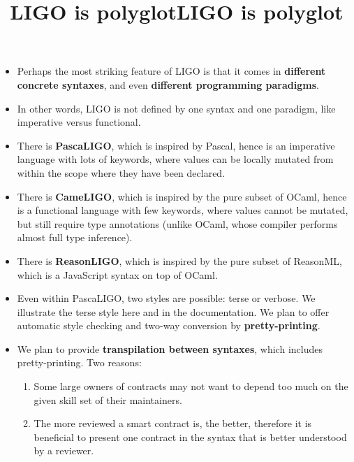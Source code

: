 \documentclass[wide]{slides}
\begin{document}
\begin{slide}
  \title{LIGO is polyglot}

  \begin{itemize}

    \item Perhaps the most striking feature of LIGO is that it comes
      in \textbf{different concrete syntaxes}, and even
      \textbf{different programming paradigms}.

    \item In other words, LIGO is not defined by one syntax and one
      paradigm, like imperative versus functional.

    \item There is \textbf{PascaLIGO}, which is inspired by Pascal,
      hence is an imperative language with lots of keywords, where
      values can be locally mutated from within the scope where they
      have been declared.

    \item There is \textbf{CameLIGO}, which is inspired by the pure
      subset of OCaml, hence is a functional language with few
      keywords, where values cannot be mutated, but still require type
      annotations (unlike OCaml, whose compiler performs almost full
      type inference).

    \item There is \textbf{ReasonLIGO}, which is inspired by the pure
      subset of ReasonML, which is a JavaScript syntax on top of
      OCaml.

  \end{itemize}

\end{slide}

\begin{slide}
  \title{LIGO is polyglot}

  \begin{itemize}

    \item Even within PascaLIGO, two styles are possible: terse or
      verbose. We illustrate the terse style here and in the
      documentation. We plan to offer automatic style checking and
      two-way conversion by \textbf{pretty\hyp{}printing}.

    \item We plan to provide \textbf{transpilation between syntaxes},
      which includes pretty-printing. Two reasons:
      \begin{enumerate}

        \item Some large owners of contracts may not want to depend
          too much on the given skill set of their maintainers.

        \item The more reviewed a smart contract is, the better,
          therefore it is beneficial to present one contract in the
          syntax that is better understood by a reviewer.

      \end{enumerate}

  \end{itemize}

\end{slide}
\end{document}
